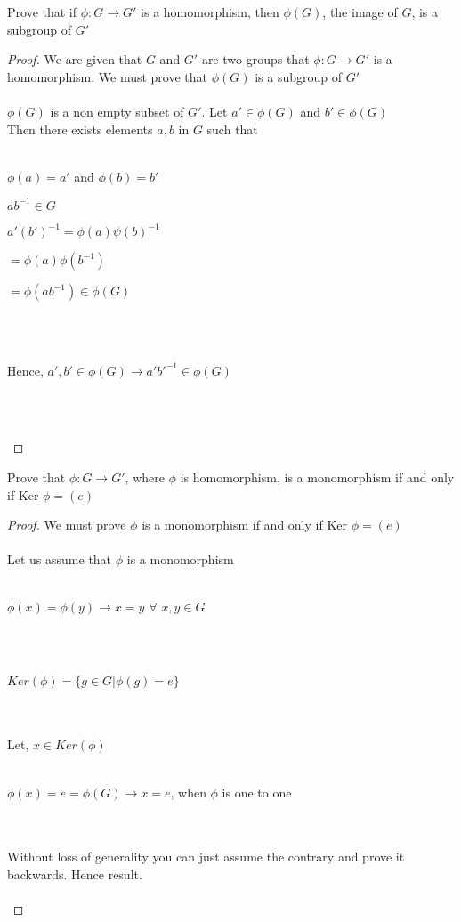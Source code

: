 \documentclass[12pt]{article}
\newenvironment{problem}[2][Problem]{\begin{trivlist}
\item[\hskip \labelsep {\bfseries #1}\hskip \labelsep {\bfseries #2.}]}{\end{trivlist}}
\begin{document}
\begin{problem}{2.5.6}
Prove that if $\phi : G \rightarrow G'$ is a homomorphism, then $\phi (G)$, the image of $G$, is a subgroup of $G'$
\end{problem}

\begin{proof}
We are given that $G$ and $G'$ are two groups that $\phi : G \rightarrow G'$ is a homomorphism. We must prove that $\phi (G)$ is a subgroup of $G'$ \\ \\
$\phi (G)$ is a non empty subset of $G'$. Let $a' \in \phi(G)$ and $b' \in \phi(G)$ \\
Then there exists elements $a,b$ in $G$ such that \\ \\
\centerline{$\phi (a) = a'$ and $\phi (b) = b'$}
\centerline{$ab^{-1} \in G$}
\centerline{$a'(b')^{-1}=\phi (a) \psi(b) ^{-1}$}
\centerline{$=\phi (a) \phi (b^{-1})$}
\centerline{$=\phi(ab^{-1}) \in \phi(G)$} \\ \\
\centerline{Hence, $a',b' \in \phi(G) \rightarrow a'b'^{-1} \in \phi(G)$} \\ \\
\centerline{}
\end{proof}
 
 \begin{problem}{2.5.7}
Prove that $\phi : G \rightarrow G'$, where $\phi$ is homomorphism, is a monomorphism if and only if Ker $\phi = (e)$
\end{problem}

\begin{proof}
We must prove $\phi$ is a monomorphism if and only if Ker $\phi = (e)$ \\ \\
Let us assume that $\phi$ is a monomorphism \\ \\
\centerline{$\phi(x) = \phi(y) \rightarrow x = y$ $\forall$ $x,y \in G$} \\ \\ 
\centerline{$Ker(\phi) = \{ g \in G | \phi(g) = e \}$} \\ \\
Let, $x \in Ker(\phi)$ \\ \\
\centerline{$\phi (x) = e = \phi(G) \rightarrow x = e$, when $\phi$ is one to one} \\ \\
Without loss of generality you can just assume the contrary and prove it backwards. Hence result. \\ \\
\end{proof}
\end{document}
